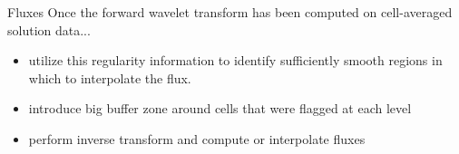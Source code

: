 \documentclass{beamer}
\begin{document}
\begin{frame}{Fluxes}
    Once the forward wavelet transform has been computed on cell-averaged solution data...
    \begin{itemize}
        \item<2-> utilize this regularity information to identify sufficiently smooth regions
            in which to interpolate the flux.
        \item<3-> introduce big buffer zone around cells that were flagged at each level
        \item<4-> perform inverse transform and compute or interpolate fluxes
    \end{itemize}
\end{frame}
\end{document}

